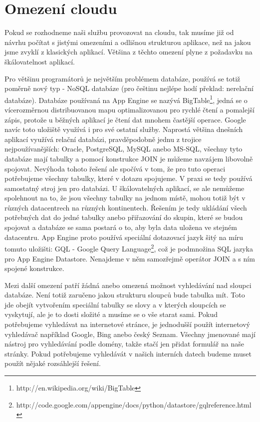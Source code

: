 \section{Omezení cloudu}
Pokud se rozhodneme naši službu provozovat na cloudu, tak musíme již od návrhu počítat s jistými omezeními a odlišnou strukturou aplikace, než na jakou jsme zvyklí z klasických aplikací. Většina z těchto omezení plyne z požadavku na škálovatelnost aplikací.

Pro většinu programátorů je největším problémem databáze, používá se totiž poměrně nový typ - NoSQL databáze (pro češtinu nejlépe hodí překlad: nerelační databáze). Databáze používaná na App Engine se nazývá BigTable\footnote{http://en.wikipedia.org/wiki/BigTable}, jedná se o vícerozměrnou distribuovanou mapu optimalizovanou pro rychlé čtení a pomalejší zápis, protože u běžných aplikací je čtení dat mnohem častější operace. Google navíc toto uložiště využívá i pro své ostatní služby. Naprostá většina dnešních aplikací využívá relační databázi, pravděpodobně jednu z trojice nejpoužívanějších: Oracle, PostgreSQL, MySQL anebo MS-SQL, všechny tyto databáze mají tabulky a pomocí konstrukce JOIN je můžeme navzájem libovolně spojovat. Nevýhoda tohoto řešení ale spočívá v tom, že pro tuto operaci potřebujeme všechny tabulky, které v dotazu spojujeme. V praxi se tedy používá samostatný stroj jen pro databázi. U škálovatelných aplikací, se ale nemůžeme spolehnout na to, že jsou všechny tabulky na jednom místě, mohou totiž být v různých datacentrech na různých kontinentech. Řešením je tedy ukládání všech potřebných dat do jedné tabulky anebo přiřazování do skupin, které se budou spojovat a databáze se sama postará o to, aby byla data uložena ve stejném datacentru. App Engine proto používá speciální dotazovací jazyk šitý na míru tomuto uložišti: GQL - Google Query Language\footnote{http://code.google.com/appengine/docs/python/datastore/gqlreference.html},
což je podmnožina SQL jazyka pro App Engine Datastore. Nenajdeme v něm samozřejmě operátor JOIN a s ním spojené konstrukce.

Mezi další omezení patří žádná anebo omezená možnost vyhledávání nad sloupci databáze. Není totiž zaručeno jakou strukturu sloupců bude tabulka mít. Toto jde obejít vytvořením speciální tabulky se slovy a v kterých sloupcích se vyskytují, ale je to dosti složité a musíme se o vše starat sami. Pokud potřebujeme vyhledávat na internetové stránce, je jednodušší použít internetový vyhledávač například Google, Bing anebo český Seznam. Všechny jmenované mají nástroj pro vyhledávání podle domény, takže stačí jen přidat formulář na naše stránky. Pokud potřebujeme vyhledávát v našich interních datech budeme muset použít nějaké rozsáhlejší řešení.

